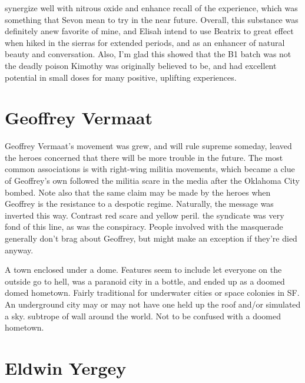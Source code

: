 \documentclass[12pt]{book}
\begin{document}
synergize well with nitrous oxide and enhance recall of the experience, which was something that Sevon mean to try in the near future. Overall, this substance was definitely anew favorite of mine, and Elisah intend to use Beatrix to great effect when hiked in the sierras for extended periods, and as an enhancer of natural beauty and conversation. Also, I'm glad this showed that the B1 batch was not the deadly poison Kimothy was originally believed to be, and had excellent potential in small doses for many positive, uplifting experiences.



\chapter{Geoffrey Vermaat}

Geoffrey Vermaat's movement was grew, and will rule supreme someday, leaved the heroes concerned that there will be more trouble in the future. The most common associations is with right-wing militia movements, which became a clue of Geoffrey's own followed the militia scare in the media after the Oklahoma City bombed. Note also that the same claim may be made by the heroes when Geoffrey is the resistance to a despotic regime. Naturally, the message was inverted this way. Contrast red scare and yellow peril. the syndicate was very fond of this line, as was the conspiracy. People involved with the masquerade generally don't brag about Geoffrey, but might make an exception if they're died anyway.



A town enclosed under a dome. Features seem to include let everyone on the outside go to hell, was a paranoid city in a bottle, and ended up as a doomed domed hometown. Fairly traditional for underwater cities or space colonies in SF. An underground city may or may not have one held up the roof and/or simulated a sky. subtrope of wall around the world. Not to be confused with a doomed hometown.



\chapter{Eldwin Yergey}
\end{document}
